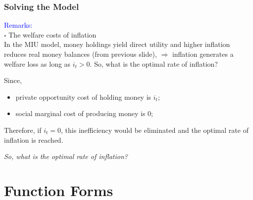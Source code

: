 \documentclass[handout]{beamer}
\begin{document}
\begin{frame}
\frametitle{Solving the Model} \vskip 0.1in

\textcolor{blue}{Remarks:}\\
$\square$ The welfare costs of inflation\\

In the MIU model, money holdings yield direct utility and higher
inflation reduces real money balances (from previous slide),
$\Rightarrow$ inflation generates a welfare loss as long as $i_t>0$.
So, what is the optimal rate of inflation? \vskip 0.1in

\pause

Since,
\begin{itemize}
\item private opportunity cost of holding money is $i_{t}$;
\item social marginal cost of producing money is 0;
\end{itemize} \vskip 0.1in

\pause

Therefore, if $i_t=0$, this inefficiency would be eliminated and the
optimal rate of inflation is reached.\\ \vskip 0.1in

\emph{So, what is the optimal rate of inflation?}


\end{frame}




\section{Function Forms}
\end{document}
